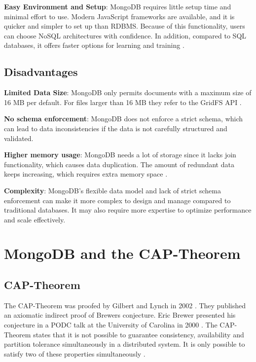 \textbf{Easy Environment and Setup}: MongoDB requires little setup time and minimal effort to use. Modern JavaScript frameworks are available, and it is quicker and simpler to set up than \ac{RDBMS}.
Because of this functionality, users can choose NoSQL architectures with confidence. In addition, compared to SQL databases, it offers faster options for learning and training \parencite{knowledgenile-pro-con, jamsheer_2019}.

\subsection{Disadvantages}

\textbf{Limited Data Size}: MongoDB only permits documents with a maximum size of 16 MB per default. For files larger than 16 MB they refer to the GridFS \ac{API} \parencite{mongodb-documents}.

\textbf{No schema enforcement}: MongoDB does not enforce a strict schema, which can lead to data inconsistencies if the data is not carefully structured and validated.

\textbf{Higher memory usage}: MongoDB needs a lot of storage since it lacks join functionality, which causes data duplication. The amount of redundant data keeps increasing, which requires extra memory space \parencite{knowledgenile-pro-con}.

\textbf{Complexity}: MongoDB's flexible data model and lack of strict schema enforcement can make it more complex to design and manage compared to traditional databases. It may also require more expertise to optimize performance and scale effectively.

\section{MongoDB and the CAP-Theorem}

\subsection{CAP-Theorem}

The \ac{CAP}-Theorem was proofed by Gilbert and Lynch in 2002 \parencite{brewer:2002}. They published an axiomatic indirect proof of Brewers conjecture. Eric Brewer presented his conjecture in a \ac{PODC} talk at the University of Carolina in 2000 \parencite{brewer2000towards}. The \ac{CAP}-Theorem states that it is not possible to guarantee consistency, availability and partition tolerance simultaneously in a distributed system. It is only possible to satisfy two of these properties simultaneously \parencite[1]{brewer:2002}.

